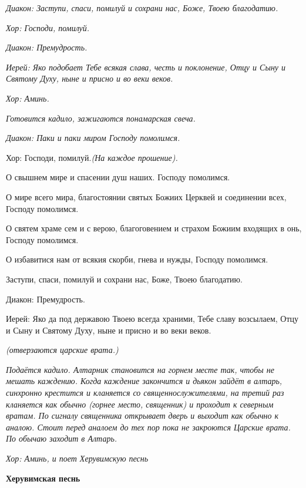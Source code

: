  \itshape  Диакон:\normalfont{} Заступи, спаси, помилуй и сохрани нас, Боже, Твоею благодатию.


\itshape Хор:\normalfont{} Господи, помилуй.


\itshape Диакон:\normalfont{} Премудрость.


\itshape  Иерей:\normalfont{} Яко подобает Тебе всякая слава, честь и поклонение, Отцу и Сыну и Святому Духу, ныне и присно и во веки веков.


\itshape  Хор:\normalfont{} Аминь.


\itshape  Готовится кадило, зажигаются понамарская свеча.\normalfont{}


 \itshape  Диакон:\normalfont{} Паки и паки миром Господу помолимся. \itshape  


  Хор:\normalfont{} Господи, помилуй.\itshape  (На каждое прошение)\normalfont{}. 


  О свышнем мире и спасении душ наших. Господу помолимся. 


  О мире всего мира, благостоянии святых Божиих Церквей и соединении всех, Господу помолимся. 


  О святем храме сем и с верою, благоговением и страхом Божиим входящих в онь, Господу помолимся. 


  О избавитися нам от всякия скорби, гнева и нужды, Господу помолимся. 


  Заступи, спаси, помилуй и сохрани нас, Боже, Твоею благодатию. \itshape 


  Диакон:\normalfont{} Премудрость. \itshape 


  Иерей:\normalfont{} Яко да под державою Твоею всегда храними, Тебе славу возсылаем, Отцу и Сыну и Святому Духу, ныне и присно и во веки веков. 


 \itshape (отверзаются царские врата.)\normalfont{}


 \itshape Подаётся кадило. Алтарник становится на горнем месте так, чтобы не мешать каждению. Когда каждение закончится и дьякон зайдёт в алтарь, синхронно крестится и кланяется со священнослужителями, на третий раз кланяется как обычно (горнее место, священник) и проходит к северным вратам. По сигналу священника открывает дверь и выходит как обычно к аналою. Стоит перед аналоем до тех пор пока не закроются Царские врата. По обычаю заходит в Алтарь\normalfont{}. 


\itshape  Хор:\normalfont{} Аминь, \itshape и поет Херувимскую песнь \normalfont{}


\medskip


 \bfseries Херувимская песнь \normalfont{}


